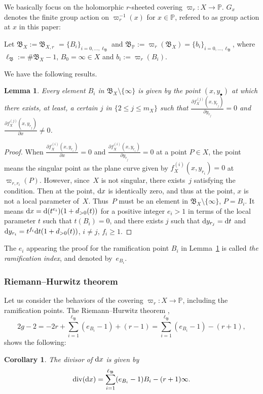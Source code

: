 \documentclass[10pt,a4paper]{amsart}
\def\PP{{\mathbb P}}
\def\fB{{\mathfrak B}}
\def\Div{\operatorname{div}}
\numberwithin{equation}{section}
\newtheorem{Corollary}[Theorem]{Corollary}
\newtheorem{Lemma}[Theorem]{Lemma}
\begin{document}
We basically focus on the holomorphic $r$-sheeted covering $\varpi_{r}\colon X \to \PP$. $G_x$ denotes the finite group action on $\varpi_r^{-1}(x)$
for $x\in \mathbb P$, refered to as group action at $x$ in this paper:
\begin{Definition}\label{2df:fBX}
Let $\fB_X:=\fB_{X,r}$ $=\{B_{i}\}_{i=0, \dots, \ell_{\fB}}$ and $\fB_{\PP}:=\varpi_r(\fB_X)=\{b_{i}\}_{i=0, \dots, \ell_{\fB}}$, where $\ell_{\fB}:= \# \fB_X-1$, $B_{0}=\infty\in X$ and $b_i :=\varpi_r(B_i)$.
\end{Definition}

We have the following results.

\begin{Lemma}\label{2lm:B_iVanish}
Every element $B_i$ in $\fB_X \setminus \{\infty\}$ is given by the point $(x, y_\bullet)$ at which there exists, at least, a certain $j$ in $\{2\le j\le m_X\}$ such that $\frac{\partial f_X^{(j)}(x,y_{r_j})}{\partial y_{r_j}}=0$
and $\frac{\partial f_X^{(j)}(x,y_{r_j})}{\partial x}\neq 0$.
\end{Lemma}

\begin{proof}
When $\frac{\partial f_X^{(i)}(x,y_{r_i})}{\partial x}=0$ and $\frac{\partial f_X^{(i)}(x,y_{r_i})}{\partial y_{r_j}}=0$ at a point $P\in X$, the point means the singular point as the plane curve given by $f_X^{(i)}(x,y_{r_i})=0$ at $\varpi_{r, r_i}(P)$.
However, since~$X$ is not singular, there exists~$j$ satisfying the condition.
Then at the point, ${\rm d} x$ is identically zero, and thus at the point, $x$ is not a local parameter of~$X$. Thus~$P$ must be an element in $\fB_X\setminus \{\infty\}$, $P=B_{i}$.
It means ${\rm d} x={\rm d}(t^{e_i})(1+d_{>0}(t))$ for a positive integer $e_i>1$ in terms of the local parameter $t$ such that $t(B_i) = 0$, and there exists $j$ such that ${\rm d} y_{r_j} = {\rm d} t$ and ${\rm d} y_{r_i} =t^{f_i} {\rm d} t(1+d_{>0}(t))$, $i \neq j$, $f_i \ge 1$.
\end{proof}

The $e_i$ appearing the proof for the ramification point $B_i$ in Lemma~\ref{2lm:B_iVanish} is called \emph{the ramification index}, and denoted by~$e_{B_i}$.

\subsubsection{Riemann--Hurwitz theorem}

Let us consider the behaviors of the covering $\varpi_r\colon X \to \PP$, including the ramification points.
The Riemann--Hurwitz theorem \cite{Kunz2004},
\begin{equation*}
2g-2 =-2r+ \sum_{i=1}^{\ell_{\fB}} (e_{B_i}-1)+(r-1)=
\sum_{i=1}^{\ell_{\fB}} (e_{B_i}-1)-(r+1),%
\end{equation*}
 shows the following:
\begin{Corollary}\label{2cr:(dx)} The divisor of ${\rm d} x$ is given by
\[
\Div({\rm d} x) =\sum_{i=1}^{\ell_{\fB}} (e_{B_i}-1) B_i - (r+1)\infty.
\]
\end{Corollary}
\end{document}
